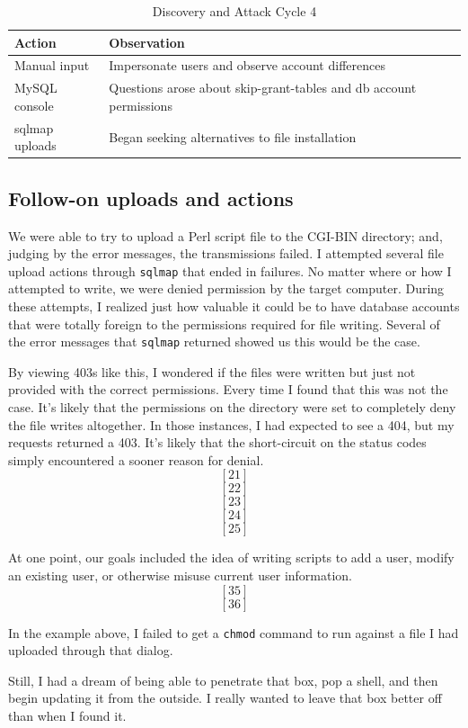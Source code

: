 \begin{table}[H]
\caption{Discovery and Attack Cycle 4}
\centering
\begin{tabular}{|l|l|}
\hline
Action & Observation \\
\hline
Manual input & Impersonate users and observe account differences \\
MySQL console & Questions arose about skip-grant-tables and db account permissions \\
sqlmap uploads & Began seeking alternatives to file installation \\
\hline
\end{tabular}
\end{table}

\subsection{Follow-on uploads and actions}
We were able to try to upload a Perl script file to the CGI-BIN directory; and, judging by the error messages, the transmissions failed.  I attempted several file upload actions through \texttt{sqlmap} that ended in failures.  No matter where or how I attempted to write, we were denied permission by the target computer.  During these attempts, I realized just how valuable it could be to have database accounts that were totally foreign to the permissions required for file writing.  Several of the error messages that \texttt{sqlmap} returned showed us this would be the case.


By viewing 403s like this, I wondered if the files were written but just not provided with the correct permissions.  Every time I found that this was not the case.  It's likely that the permissions on the directory were set to completely deny the file writes altogether.  In those instances, I had expected to see a 404, but my requests returned a 403.  It's likely that the short-circuit on the status codes simply encountered a sooner reason for denial. \[[21]\]\[[22]\]\[[23]\]\[[24]\]\[[25]\]

At one point, our goals included the idea of writing scripts to add a user, modify an existing user, or otherwise misuse current user information. \[[35]\] \[[36]\]

In the example above, I failed to get a \texttt{chmod} command to run against a file I had uploaded through that dialog.

Still, I had a dream of being able to penetrate that box, pop a shell, and then begin updating it from the outside.  I really wanted to leave that box better off than when I found it.  

